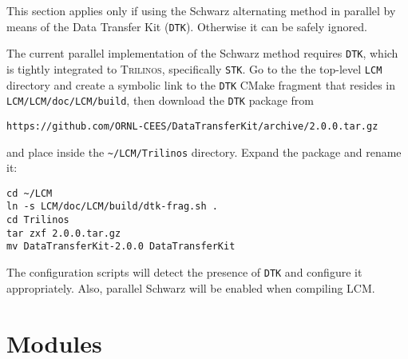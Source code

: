 \documentclass{article}
\newcommand{\trilinos}{\textsc{Trilinos}}
\begin{document}
This section applies only if using the Schwarz alternating method in parallel by
means of the Data Transfer Kit (\verb+DTK+).  Otherwise it can be safely
ignored.

The current parallel implementation of the Schwarz method requires \verb+DTK+,
which is tightly integrated to \trilinos{}, specifically \verb+STK+. Go to the
the top-level \verb+LCM+ directory and create a symbolic link to the \verb+DTK+
CMake fragment that resides in \verb+LCM/LCM/doc/LCM/build+, then download
the \verb+DTK+ package from

\begin{verbatim}
https://github.com/ORNL-CEES/DataTransferKit/archive/2.0.0.tar.gz
\end{verbatim}

\noindent
and place inside the \verb+~/LCM/Trilinos+ directory. Expand the package and
rename it:
\begin{verbatim}
cd ~/LCM
ln -s LCM/doc/LCM/build/dtk-frag.sh .
cd Trilinos
tar zxf 2.0.0.tar.gz
mv DataTransferKit-2.0.0 DataTransferKit
\end{verbatim}
The configuration scripts will detect the presence of \verb+DTK+ and
configure it appropriately. Also, parallel Schwarz will be enabled when
compiling LCM.

\section{Modules}
\label{sec:modules}
\end{document}
